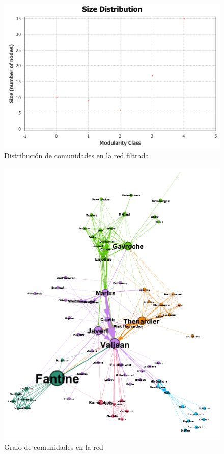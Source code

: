 \begin{figure}[H]
	\centering
	\includegraphics[width=12cm]{../images/communities-size-distribution}
	\caption{Distribución de comunidades en la red filtrada}
	\label{fig:communities-size-distribution}
\end{figure}

\begin{figure}[H]
	\centering
	\includegraphics[width=12cm]{../images/modularity-class}
	\caption{Grafo de comunidades en la red}
	\label{fig:modularity-class}
\end{figure}






